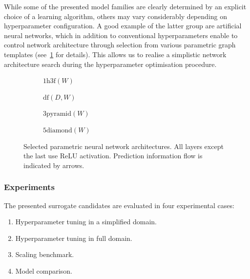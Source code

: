 While some of the presented model families are clearly determined by an explicit
choice of a learning algorithm, others may vary considerably depending on
hyperparameter configuration. A good example of the latter group are artificial neural
networks, which in addition to conventional hyperparameters enable to control network
architecture through selection from various parametric graph templates
(see~\cref{fig:nn-archs} for details). This allows us to realise a simplistic
network architecture search during the hyperparameter optimisation procedure.

\begin{figure}[h]
	\centering
	\begin{subfigure}[b]{0.25\textwidth}
		\centering
		{\scriptsize {}}
		\caption{$\text{1h3f}(W)$}
	\end{subfigure}\hfill%
	\begin{subfigure}[b]{0.25\textwidth}
		\centering
		{\scriptsize {}}
		\caption{$\text{df}(D,W)$}
	\end{subfigure}\hfill%
	\begin{subfigure}[b]{0.25\textwidth}
		\centering
		{\scriptsize {}}
		\caption{$\text{3pyramid}(W)$}
	\end{subfigure}\hfill%
	\begin{subfigure}[b]{0.25\textwidth}
		\centering
		{\scriptsize {}}
		\caption{$\text{5diamond}(W)$}
	\end{subfigure}

	\caption{Selected parametric neural network architectures. All layers except
		the last use ReLU activation. Prediction information flow is indicated by
		arrows.}
	\label{fig:nn-archs}
\end{figure}

\subsubsection{Experiments}
\label{sec:experiment-methodology}

The presented surrogate candidates are evaluated in four experimental cases:%
\begin{enumerate}
	\item Hyperparameter tuning in a simplified domain.

	\item Hyperparameter tuning in full domain.

	\item Scaling benchmark.

	\item Model comparison.
\end{enumerate}

